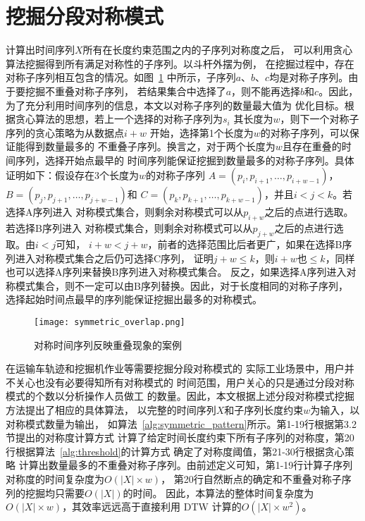 \section{挖掘分段对称模式}

计算出时间序列$X$所有在长度约束范围之内的子序列对称度之后，
可以利用贪心算法挖掘得到所有满足对称性的子序列。以斗杆外摆为例，
在挖掘过程中，存在对称子序列相互包含的情况。如图~\ref{fig:overlap}
中所示，子序列$a$、$b$、$c$均是对称子序列。由于要挖掘不重叠对称子序列，
若结果集合中选择了$a$，则不能再选择$b$和$c$。因此，
为了充分利用时间序列的信息，本文以对称子序列的数量最大值为
优化目标。根据贪心算法的思想，若上一个选择的对称子序列为$s_i$
其长度为$w$，则下一个对称子序列的贪心策略为从数据点$i+w$
开始，选择第1个长度为$w$的对称子序列，可以保证能得到数量最多的
不重叠子序列。换言之，对于两个长度为$w$且存在重叠的时间序列，选择开始点最早的
时间序列能保证挖掘到数量最多的对称子序列。具体证明如下：假设存在3个长度为$w$的对称子序列
$A=\left(p_{i}, p_{i+1}, \dots, p_{i+w-1}\right)$，$B=\left(p_{j}, p_{j+1}, \dots, p_{j+w-1}\right)$和
$C=\left(p_{k}, p_{k+1}, \dots, p_{k+w-1}\right)$，并且$i<j<k$。若选择A序列进入
对称模式集合，则剩余对称模式可以从$p_{i+w}$之后的点进行选取。若选择B序列进入
对称模式集合，则剩余对称模式可以从$p_{j+w}$之后的点进行选取。由$i<j$可知，
$i+w<j+w$，前者的选择范围比后者更广，如果在选择B序列进入对称模式集合之后仍可选择C序列，
证明$j+w \leq k$，则$i+w$也$\leq k$，同样也可以选择A序列来替换B序列进入对称模式集合。
反之，如果选择A序列进入对称模式集合，则不一定可以由B序列替换。因此，对于长度相同的对称子序列，
选择起始时间点最早的序列能保证挖掘出最多的对称模式。

\begin{figure}
  \centering
  \texttt{[image: symmetric\_overlap.png]}
  \caption{对称时间序列反映重叠现象的案例}
  \label{fig:overlap}
\end{figure}

在运输车轨迹和挖掘机作业等需要挖掘分段对称模式的
实际工业场景中，用户并不关心也没有必要得知所有对称模式的
时间范围，用户关心的只是通过分段对称模式的个数以分析操作人员做工
的数量。因此，本文根据上述分段对称模式挖掘方法提出了相应的具体算法，
以完整的时间序列$X$和子序列长度约束$w$为输入，以对称模式数量为输出，
如算法~\ref{alg:symmetric_pattern}所示。第1-19行根据第3.2节提出的对称度计算方式
计算了给定时间长度约束下所有子序列的对称度，第20行根据算法~\ref{alg:threshold}的计算方式
确定了对称度阈值，第21-30行根据贪心策略
计算出数量最多的不重叠对称子序列。由前述定义可知，第1-19行计算子序列对称度的时间复杂度为$O(|X| \times w)$，
第20行自然断点的确定和不重叠对称子序列的挖掘均只需要$O(|X|)$的时间。
因此，本算法的整体时间复杂度为$O(|X| \times w)$，其效率远远高于直接利用
DTW 计算的$O\left(|X| \times w^{2}\right)$。
\renewcommand{\algorithmicrequire}{\textbf{输入：}\unskip}
\renewcommand{\algorithmicensure}{\textbf{输出：}\unskip}

